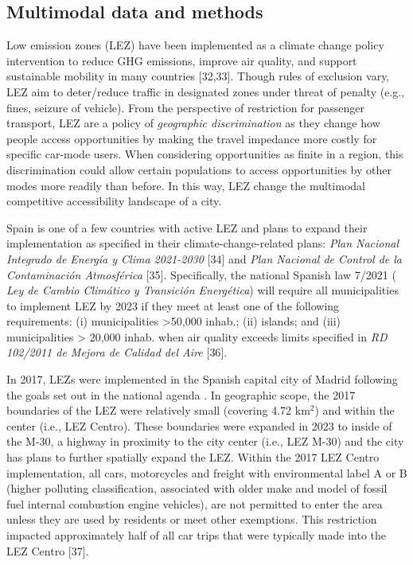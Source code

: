 \documentclass[10pt,letterpaper]{article}
\begin{document}
\hypertarget{multimodal-data-and-methods}{%
\subsection{Multimodal data and
methods}\label{multimodal-data-and-methods}}

Low emission zones (LEZ) have been implemented as a climate change
policy intervention to reduce GHG emissions, improve air quality, and
support sustainable mobility in many countries {[}32,33{]}. Though rules
of exclusion vary, LEZ aim to deter/reduce traffic in designated zones
under threat of penalty (e.g., fines, seizure of vehicle). From the
perspective of restriction for passenger transport, LEZ are a policy of
\emph{geographic discrimination} as they change how people access
opportunities by making the travel impedance more costly for specific
car-mode users. When considering opportunities as finite in a region,
this discrimination could allow certain populations to access
opportunities by other modes more readily than before. In this way, LEZ
change the multimodal competitive accessibility landscape of a city.

Spain is one of a few countries with active LEZ and plans to expand
their implementation as specified in their climate-change-related plans:
\emph{Plan Nacional Integrado de Energía y Clima 2021-2030} {[}34{]} and
\emph{Plan Nacional de Control de la Contaminación Atmosférica}
{[}35{]}. Specifically, the national Spanish law 7/2021 ( \emph{Ley de
Cambio Climático y Transición Energética}) will require all
municipalities to implement LEZ by 2023 if they meet at least one of the
following requirements: (i) municipalities \textgreater50,000 inhab.;
(ii) islands; and (iii) municipalities \textgreater{} 20,000 inhab. when
air quality exceeds limits specified in \emph{RD 102/2011 de Mejora de
Calidad del Aire} {[}36{]}.

In 2017, LEZs were implemented in the Spanish capital city of Madrid
following the goals set out in the national agenda . In geographic
scope, the 2017 boundaries of the LEZ were relatively small (covering
4.72 km\(^2\)) and within the center (i.e., LEZ Centro). These
boundaries were expanded in 2023 to inside of the M-30, a highway in
proximity to the city center (i.e., LEZ M-30) and the city has plans to
further spatially expand the LEZ. Within the 2017 LEZ Centro
implementation, all cars, motorcycles and freight with environmental
label A or B (higher polluting classification, associated with older
make and model of fossil fuel internal combustion engine vehicles), are
not permitted to enter the area unless they are used by residents or
meet other exemptions. This restriction impacted approximately half of
all car trips that were typically made into the LEZ Centro {[}37{]}.
\end{document}
